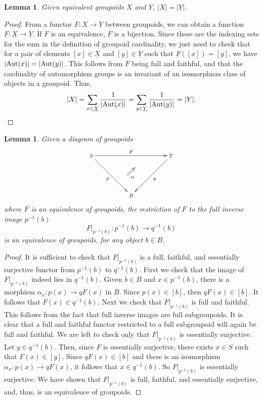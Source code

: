 \documentclass{article}
\renewcommand{\to}{\rightarrow}
\newcommand{\maps}{\colon}
\newcommand{\Aut}{{\rm Aut}}
\renewcommand{\u}[1]{\underline{#1}}
\newtheorem{lemma}[thm]{Lemma}
\begin{document}
\begin{lemma}\label{EQUIVGRPD}
Given equivalent groupoids $X$ and $Y$, $|X| = |Y|$.
\end{lemma}

\begin{proof}
From a functor $F \maps X \to Y$ between groupoids, we can
obtain a function $\u{F} \maps \u{X} \to 
\u{Y}$.  If $F$ is an equivalence, $\u{F}$
is a bijection.  Since these are the indexing sets for the sum 
in the definition of groupoid cardinality, we just need to check 
that for a pair of elements $[x] \in \u{X}$ and 
$[y] \in \u{Y}$ such that $\u{F}([x]) = [y]$, we
have $|\Aut(x)| = |\Aut(y)|$.  This follows from $F$ being full 
and faithful, and that the cardinality of automorphism
groups is an invariant of an isomorphism class of objects in a
groupoid.  Thus,
\[ |X| = 
\sum_{x \in \u{X}}\frac{1}{|\Aut(x)|} = 
\sum_{y \in \u{Y}}\frac{1}{|\Aut(y)|} = 
|Y|. \]
\end{proof}

\begin{lemma}\label{ESSENTIALPULLBACK}
Given a diagram of groupoids
\[ \def\objectstyle{\scriptstyle}
  \def\labelstyle{\scriptstyle}
   \xy
   (-20,10)*+{S}="1";
   (0,-10)*+{B}="2";
   (20,10)*+{T}="3";
        {\ar_{p} "1";"2"};
        {\ar^{q} "3";"2"};
        {\ar^{F} "1";"3"};
        {\ar@{=>}_<<{\scriptstyle \alpha} (-2,0); (2,4)};
\endxy
\]
where $F$ is an equivalence of groupoids, the
restriction of $F$ to the full inverse image $p^{-1}(b)$
\[ F|_{p^{-1}(b)} \maps p^{-1}(b) \to q^{-1}(b) \]
is an equivalence of groupoids, for any object $b\in B$.
\end{lemma}

\begin{proof}
It is sufficient to check that $F|_{p^{-1}(b)}$ is a full, faithful,
and essentially surjective functor from $p^{-1}(b)$ to $q^{-1}(b)$.
First we check that the image of $F|_{p^{-1}(b)}$ indeed lies in
$q^{-1}(b)$.  Given $b \in B$ and $x \in p^{-1}(b)$, there is
a morphism $\alpha_x \maps p(x) \to qF(x)$ in $B$.  Since $p(x) \in
[b]$, then $qF(x) \in [b]$.  It follows that $F(x) \in
q^{-1}(b)$.  Next we check that $F|_{p^{-1}(b)}$ is full and
faithful.  This follows from the fact that full inverse images are
full subgroupoids.  It is clear that a full and faithful functor
restricted to a full subgroupoid will again be full and faithful.  We
are left to check only that $F|_{p^{-1}(b)}$ is essentially
surjective.  Let $y \in q^{-1}(b)$.  Then, since $F$ is
essentially surjective, there exists $x \in S$ such that $F(x)
\in [y]$.  Since $qF(x) \in [b]$ and there is an isomorphism $\alpha_x
\maps p(x) \to qF(x)$, it follows that $x \in q^{-1}(b)$.  So
$F|_{p^{-1}(b)}$ is essentially surjective.  We have shown that
$F|_{p^{-1}(b)}$ is full, faithful, and essentially surjective, and,
thus, is an equivalence of groupoids.
\end{proof}
\end{document}
